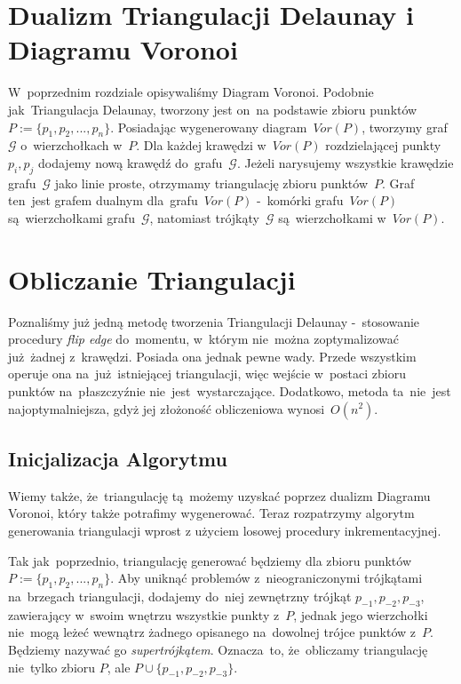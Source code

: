 \documentclass[skorowidz,autorrok,backref,xodstep,oswiadczenie]{wmimgr}
\begin{document}
\section{Dualizm Triangulacji Delaunay i Diagramu Voronoi}

W~poprzednim rozdziale opisywaliśmy Diagram Voronoi. Podobnie jak~Triangulacja Delaunay, tworzony jest on~na podstawie zbioru punktów~$P:=\{ p_{1},p_{2},...,p_{n} \}$. Posiadając wygenerowany diagram~$Vor(P)$, tworzymy graf~$\mathcal{G}$ o~wierzchołkach w~$P$. Dla każdej krawędzi w~$Vor(P)$ rozdzielającej punkty $p_{i}, p_{j}$ dodajemy nową krawędź do~grafu~$\mathcal{G}$. Jeżeli narysujemy wszystkie krawędzie grafu~$\mathcal{G}$ jako linie proste, otrzymamy triangulację zbioru punktów~$P$. Graf ten~jest grafem dualnym dla~grafu~$Vor(P)$ -~komórki grafu~$Vor(P)$ są~wierzchołkami grafu~$\mathcal{G}$, natomiast trójkąty~$\mathcal{G}$ są~wierzchołkami w~$Vor(P)$.

\section{Obliczanie Triangulacji}

Poznaliśmy już jedną metodę tworzenia Triangulacji Delaunay -~stosowanie procedury \emph{flip edge} do~momentu, w~którym nie~można zoptymalizować już~żadnej z~krawędzi. Posiada ona jednak pewne wady. Przede wszystkim operuje ona na~już~istniejącej triangulacji, więc wejście w~postaci zbioru punktów na~płaszczyźnie nie~jest~wystarczające. Dodatkowo, metoda ta~nie~jest najoptymalniejsza, gdyż jej złożoność obliczeniowa wynosi~$O(n^2)$.

\subsection{Inicjalizacja Algorytmu}

Wiemy także, że~triangulację tą~możemy uzyskać poprzez dualizm Diagramu Voronoi, który także potrafimy wygenerować. Teraz rozpatrzymy algorytm generowania triangulacji wprost z użyciem losowej procedury inkrementacyjnej.

Tak jak~poprzednio, triangulację generować będziemy dla zbioru punktów~$P:=\{ p_{1},p_{2},...,p_{n} \}$. Aby uniknąć problemów z~nieograniczonymi trójkątami na~brzegach triangulacji, dodajemy do~niej zewnętrzny trójkąt $p_{-1}, p_{-2}, p_{-3}$, zawierający w~swoim wnętrzu wszystkie punkty z~$P$, jednak jego wierzchołki nie~mogą leżeć wewnątrz żadnego opisanego na~dowolnej trójce punktów z~$P$. Będziemy nazywać go \emph{supertrójkątem}. Oznacza~to, że~obliczamy triangulację nie~tylko zbioru $P$, ale $P \cup \{p_{-1}, p_{-2}, p_{-3}\}$.
\end{document}
